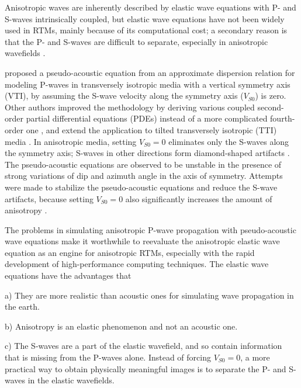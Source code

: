 \documentclass[manuscript,ulem,graphix,revised]{geophysics}
\begin{document}
Anisotropic waves are inherently described by elastic wave equations with P- and S-waves intrinsically coupled, but elastic wave equations have not been widely used in RTMs, mainly because of its computational cost; a secondary reason is that the P- and S-waves are difficult to separate, especially in anisotropic wavefields \citep{dellinger90}. 

\citet{alkhalifah98} proposed a pseudo-acoustic equation from an approximate dispersion relation for modeling P-waves in transversely isotropic media with a vertical symmetry axis (VTI), by assuming the S-wave velocity along the symmetry axis ($V_{S0}$) is zero. Other authors improved the methodology by deriving various coupled second-order partial differential equations (PDEs) instead of a more complicated fourth-order one \citep{alkhalifah00,klie01,hestholm07,du08,fowler10}, and extend the application to tilted transversely isotropic (TTI) media \citep{zhou06}. In anisotropic media, setting $V_{S0}=0$ eliminates only the S-waves along the symmetry axis; S-waves in other directions form diamond-shaped artifacts \citep{grechka04}. 
The pseudo-acoustic equations are observed to be unstable \citep{fletcher08, zhang08} in the presence of strong variations of dip and azimuth angle in the axis of symmetry. Attempts were made to stabilize the pseudo-acoustic equations and reduce the S-wave artifacts, because setting $V_{S0}=0$ also significantly increases the amount of anisotropy \citep{alkhalifah00, fletcher09,zhang11}. 

The problems in simulating anisotropic P-wave propagation with pseudo-acoustic wave equations make it worthwhile to reevaluate the anisotropic elastic wave equation as an engine for anisotropic RTMs, especially with the rapid development of high-performance computing techniques. The elastic wave equations have the advantages that

\begin{hangparas}{.25in}{1}
a) They are more realistic than acoustic ones for simulating wave propagation in the earth.

b) Anisotropy is an elastic phenomenon and not an acoustic one.

c) The S-waves are a part of the elastic wavefield, and so contain information that is missing from the P-waves alone. Instead of forcing $V_{S0}=0$, a more practical way to obtain physically meaningful images is to separate the P- and S-waves in the elastic wavefields. 
\end{hangparas}
\end{document}

